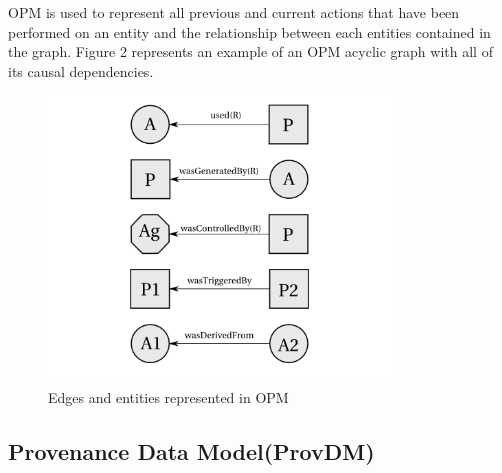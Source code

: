 OPM is used to represent all previous and current actions that have been performed on an entity and  the relationship between each entities contained in the graph. Figure 2 represents an example of an OPM acyclic graph with all of its causal dependencies.  

\begin{figure}[h]
\begin{center}
\includegraphics[height=3.0in]{opm_convention.PNG}
\end{center}
\caption{Edges and entities represented in OPM}
\label{autom}
\end{figure}



\subsection{Provenance Data Model(Prov\-DM)}

